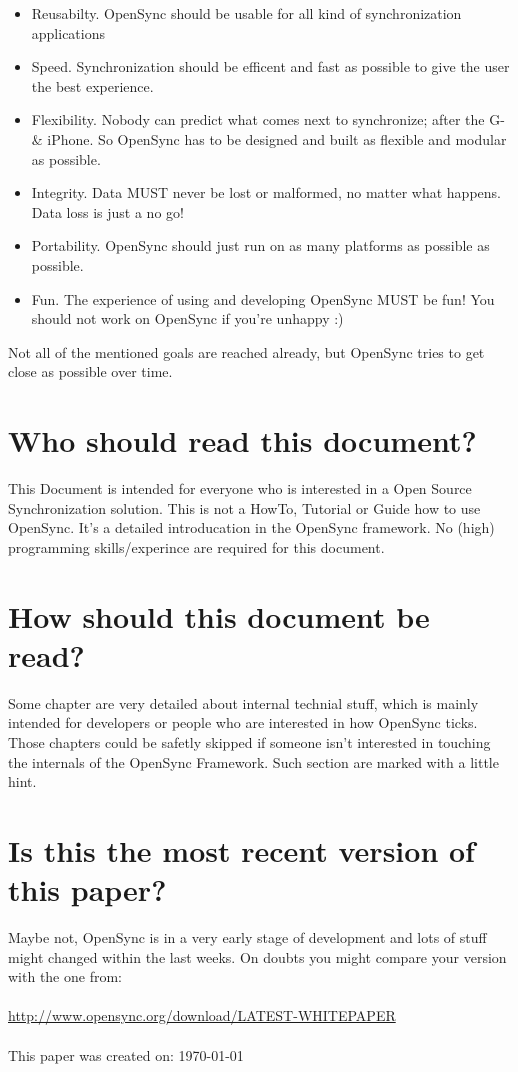 \begin{itemize}
 \item Reusabilty. OpenSync should be usable for all kind of synchronization 
 applications
 \item Speed. Synchronization should be efficent and fast as possible to give the
 user the best experience.
 \item Flexibility. Nobody can predict what comes next to synchronize; after the
 G- \& iPhone. So OpenSync has to be designed and built as flexible and modular 
 as possible.
 \item Integrity. Data MUST never be lost or malformed, no matter what happens. 
 Data loss is just a no go!
 \item Portability. OpenSync should just run on as many platforms as possible as 
 possible.
 \item Fun. The experience of using and developing OpenSync MUST be fun! You 
 should not work on OpenSync if you're unhappy :)
\end{itemize}
Not all of the mentioned goals are reached already, but OpenSync tries to get 
close as possible over time.

\section{Who should read this document?}
This Document is intended for everyone who is interested in a Open Source 
Synchronization solution. This is not a HowTo, Tutorial or Guide how to use 
OpenSync. It's a detailed introducation in the OpenSync framework. No (high) 
programming skills/experince are required for this document.

\section{How should this document be read?}
Some chapter are very detailed about internal technial stuff, which is mainly 
intended for developers or people who are interested in how OpenSync ticks. Those
chapters could be safetly skipped if someone isn't interested in touching the
internals of the OpenSync Framework. Such section are marked with a little hint.

\section{Is this the most recent version of this paper?}
Maybe not, OpenSync is in a very early stage of development and lots of stuff
might changed within the last weeks. On doubts you might compare your version 
with the one from:\\
\\
\hyperref[http://www.opensync.org/download/LATEST-WHITEPAPER]{http://www.opensync.org/download/LATEST-WHITEPAPER}\\
\\
This paper was created on: \today
